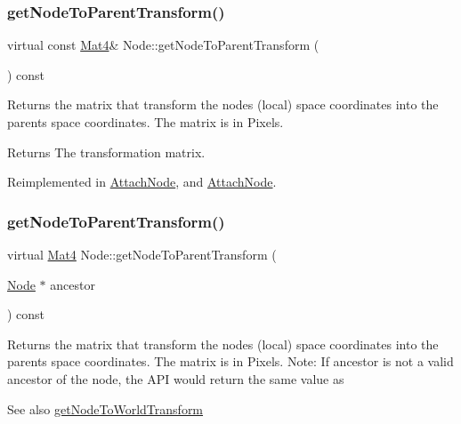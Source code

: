 \subsubsection{\texorpdfstring{get\+Node\+To\+Parent\+Transform()}{getNodeToParentTransform()}\hspace{0.1cm}{\footnotesize\ttfamily [3/4]}}
{\footnotesize\ttfamily virtual const \hyperlink{classMat4}{Mat4}\& Node\+::get\+Node\+To\+Parent\+Transform (\begin{DoxyParamCaption}{ }\end{DoxyParamCaption}) const\hspace{0.3cm}{\ttfamily [virtual]}}

Returns the matrix that transform the node\textquotesingle{}s (local) space coordinates into the parent\textquotesingle{}s space coordinates. The matrix is in Pixels.

\begin{DoxyReturn}{Returns}
The transformation matrix. 
\end{DoxyReturn}


Reimplemented in \hyperlink{classAttachNode_a0b751dd5e5c67cada4ab1e27f67f8a71}{Attach\+Node}, and \hyperlink{classAttachNode_acff1e6467b97ca416e45af09c28028d6}{Attach\+Node}.

\mbox{\label{classNode_af403db8a8c516faa4462fd3a87f6eb9a}} 
\subsubsection{\texorpdfstring{get\+Node\+To\+Parent\+Transform()}{getNodeToParentTransform()}\hspace{0.1cm}{\footnotesize\ttfamily [4/4]}}
{\footnotesize\ttfamily virtual \hyperlink{classMat4}{Mat4} Node\+::get\+Node\+To\+Parent\+Transform (\begin{DoxyParamCaption}\item[{\hyperlink{classNode}{Node} $\ast$}]{ancestor }\end{DoxyParamCaption}) const\hspace{0.3cm}{\ttfamily [virtual]}}

Returns the matrix that transform the node\textquotesingle{}s (local) space coordinates into the parent\textquotesingle{}s space coordinates. The matrix is in Pixels. Note\+: If ancestor is not a valid ancestor of the node, the A\+PI would return the same value as \begin{DoxySeeAlso}{See also}
\hyperlink{classNode_a1e46065101d0d5dba32262067d85bf23}{get\+Node\+To\+World\+Transform}
\end{DoxySeeAlso}

